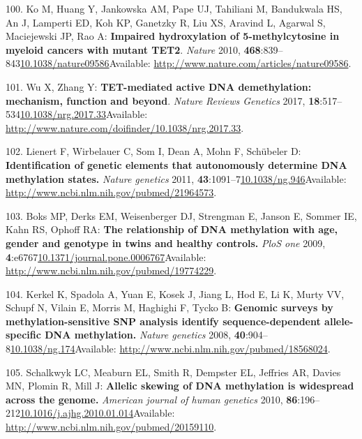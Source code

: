 \documentclass[
]{book}
\begin{document}
\leavevmode\hypertarget{ref-Ko2010a}{}%
100. Ko M, Huang Y, Jankowska AM, Pape UJ, Tahiliani M, Bandukwala HS, An J, Lamperti ED, Koh KP, Ganetzky R, Liu XS, Aravind L, Agarwal S, Maciejewski JP, Rao A: \textbf{Impaired hydroxylation of 5-methylcytosine in myeloid cancers with mutant TET2}. \emph{Nature} 2010, \textbf{468}:839--843\href{https://doi.org/10.1038/nature09586}{10.1038/nature09586}Available: \url{http://www.nature.com/articles/nature09586}.

\leavevmode\hypertarget{ref-Wu2017}{}%
101. Wu X, Zhang Y: \textbf{TET-mediated active DNA demethylation: mechanism, function and beyond}. \emph{Nature Reviews Genetics} 2017, \textbf{18}:517--534\href{https://doi.org/10.1038/nrg.2017.33}{10.1038/nrg.2017.33}Available: \url{http://www.nature.com/doifinder/10.1038/nrg.2017.33}.

\leavevmode\hypertarget{ref-Lienert2011}{}%
102. Lienert F, Wirbelauer C, Som I, Dean A, Mohn F, Schübeler D: \textbf{Identification of genetic elements that autonomously determine DNA methylation states.} \emph{Nature genetics} 2011, \textbf{43}:1091--7\href{https://doi.org/10.1038/ng.946}{10.1038/ng.946}Available: \url{http://www.ncbi.nlm.nih.gov/pubmed/21964573}.

\leavevmode\hypertarget{ref-Boks2009}{}%
103. Boks MP, Derks EM, Weisenberger DJ, Strengman E, Janson E, Sommer IE, Kahn RS, Ophoff RA: \textbf{The relationship of DNA methylation with age, gender and genotype in twins and healthy controls.} \emph{PloS one} 2009, \textbf{4}:e6767\href{https://doi.org/10.1371/journal.pone.0006767}{10.1371/journal.pone.0006767}Available: \url{http://www.ncbi.nlm.nih.gov/pubmed/19774229}.

\leavevmode\hypertarget{ref-Kerkel2008}{}%
104. Kerkel K, Spadola A, Yuan E, Kosek J, Jiang L, Hod E, Li K, Murty VV, Schupf N, Vilain E, Morris M, Haghighi F, Tycko B: \textbf{Genomic surveys by methylation-sensitive SNP analysis identify sequence-dependent allele-specific DNA methylation.} \emph{Nature genetics} 2008, \textbf{40}:904--8\href{https://doi.org/10.1038/ng.174}{10.1038/ng.174}Available: \url{http://www.ncbi.nlm.nih.gov/pubmed/18568024}.

\leavevmode\hypertarget{ref-Schalkwyk2010}{}%
105. Schalkwyk LC, Meaburn EL, Smith R, Dempster EL, Jeffries AR, Davies MN, Plomin R, Mill J: \textbf{Allelic skewing of DNA methylation is widespread across the genome.} \emph{American journal of human genetics} 2010, \textbf{86}:196--212\href{https://doi.org/10.1016/j.ajhg.2010.01.014}{10.1016/j.ajhg.2010.01.014}Available: \url{http://www.ncbi.nlm.nih.gov/pubmed/20159110}.
\end{document}
